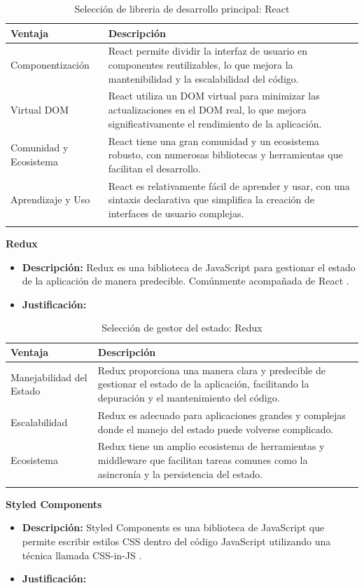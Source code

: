 \begin{longtable}{|p{3cm}|p{10cm}|}
\hline
\textbf{Ventaja} & \textbf{Descripción} \\ \hline
Componentización & React permite dividir la interfaz de usuario en componentes reutilizables, lo que mejora la mantenibilidad y la escalabilidad del código. \\ \hline
Virtual DOM & React utiliza un DOM virtual para minimizar las actualizaciones en el DOM real, lo que mejora significativamente el rendimiento de la aplicación. \\ \hline
Comunidad y Ecosistema & React tiene una gran comunidad y un ecosistema robusto, con numerosas bibliotecas y herramientas que facilitan el desarrollo. \\ \hline
Aprendizaje y Uso & React es relativamente fácil de aprender y usar, con una sintaxis declarativa que simplifica la creación de interfaces de usuario complejas. \\ \hline
\caption{Selección de libreria de desarrollo principal: React}
\end{longtable}

\textbf{Redux}
\begin{itemize}[label={}, leftmargin=0pt]
    \item \textbf{Descripción:} Redux es una biblioteca de JavaScript para gestionar el estado de la aplicación de manera predecible. Comúnmente acompañada de React \cite{redux_website}.
    \item \textbf{Justificación:}
\end{itemize}

\begin{longtable}{|p{3cm}|p{10cm}|}
\hline
\textbf{Ventaja} & \textbf{Descripción} \\ \hline
Manejabilidad del Estado & Redux proporciona una manera clara y predecible de gestionar el estado de la aplicación, facilitando la depuración y el mantenimiento del código. \\ \hline
Escalabilidad & Redux es adecuado para aplicaciones grandes y complejas donde el manejo del estado puede volverse complicado. \\ \hline
Ecosistema & Redux tiene un amplio ecosistema de herramientas y middleware que facilitan tareas comunes como la asincronía y la persistencia del estado. \\ \hline
\caption{Selección de gestor del estado: Redux}
\end{longtable}

\textbf{Styled Components}
\begin{itemize}[label={}, leftmargin=0pt]
    \item \textbf{Descripción:} Styled Components es una biblioteca de JavaScript que permite escribir estilos CSS dentro del código JavaScript utilizando una técnica llamada CSS-in-JS \cite{styled_components_website}.
    \item \textbf{Justificación:}
\end{itemize}


